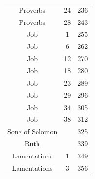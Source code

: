 \documentclass{article}
\newlength{\minipageheight}
\newlength{\minipagewidth}
\begin{document}
\begin{minipage}[l][\minipageheight][t]{\minipagewidth}
\begin{center}
\begin{tabular}{|c|c|c|}
            Proverbs        & 24      & 236  \\
            Proverbs        & 28      & 243  \\
            Job             & 1       & 255  \\
            Job             & 6       & 262  \\
            Job             & 12      & 270  \\
            Job             & 18      & 280  \\
            Job             & 23      & 289  \\
            Job             & 29      & 296  \\
            Job             & 34      & 305  \\
            Job             & 38      & 312  \\
            Song of Solomon &         & 325  \\
            Ruth            &         & 339  \\
            Lamentations    & 1       & 349  \\
            Lamentations    & 3       & 356  \\
            \hline
        \end{tabular}
    \end{center}
\end{minipage}%
%
%
%
\end{document}
